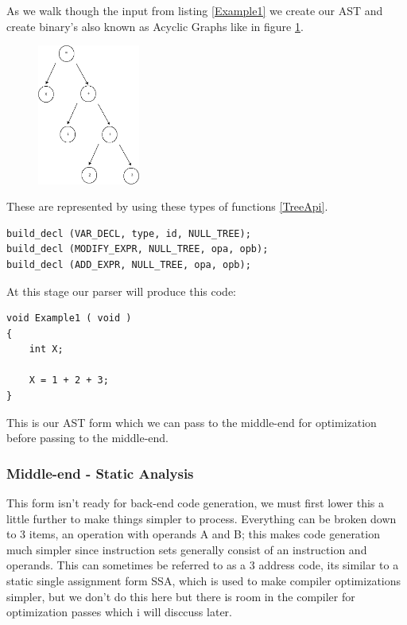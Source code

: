 \documentclass[defaultstyle,11pt]{article}
\begin{document}
As we walk though the input from listing \ref{Example1} we create our AST and create binary's also known
as Acyclic Graphs like in figure \ref{fig:DAG}.

\begin{figure}[h!]
\centering
 \label{fig:DAG}
 \includegraphics[totalheight=0.3\textheight, width=0.3\textwidth]{DAG1.png}
\end{figure}

These are represented by using these types of functions \ref{TreeApi}.

\begin{lstlisting}
build_decl (VAR_DECL, type, id, NULL_TREE);
build_decl (MODIFY_EXPR, NULL_TREE, opa, opb);
build_decl (ADD_EXPR, NULL_TREE, opa, opb);
\end{lstlisting}

At this stage our parser will produce this code:

\begin{lstlisting}
void Example1 ( void )
{
	int X; 

	X = 1 + 2 + 3;
}
\end{lstlisting}

This is our AST form which we can pass to the middle-end for optimization before passing to the middle-end.

\subsubsection{Middle-end - Static Analysis}
This form isn't ready for back-end code generation, we must first lower this a little further to make things simpler to process.
Everything can be broken down to 3 items, an operation with operands A and B; this makes code generation
much simpler since instruction sets generally consist of an instruction and operands.
This can sometimes be referred to as a 3 address code, its similar to a static single assignment
form SSA, which is used to make compiler optimizations simpler, but we don't do this here but there is room in the compiler
for optimization passes which i will disccuss later.
\end{document}
